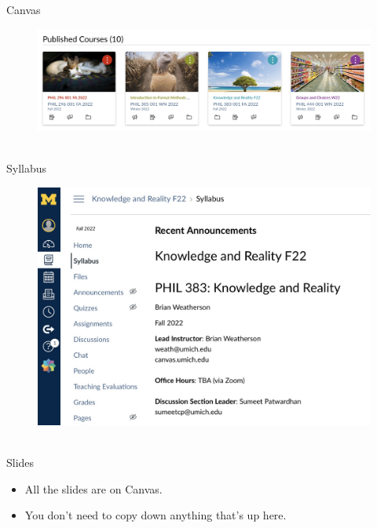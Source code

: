 \documentclass[
  17pt,
  letterpaper,
  ignorenonframetext,
  aspectratio=169,
]{beamer}
\providecommand{\tightlist}{%
  \setlength{\itemsep}{0pt}\setlength{\parskip}{0pt}}\usepackage{longtable,booktabs,array}
\begin{document}
\begin{frame}{Canvas}
\protect\hypertarget{canvas}{}
\begin{figure}

{\centering \includegraphics[width=\textwidth,height=0.6\textheight]{../images/canvas.jpeg}

}

\caption{~}

\end{figure}
\end{frame}

\begin{frame}{Syllabus}
\protect\hypertarget{syllabus}{}
\begin{figure}

{\centering \includegraphics[width=\textwidth,height=0.6\textheight]{../images/syllabus.jpeg}

}

\caption{~}

\end{figure}
\end{frame}

\begin{frame}{Slides}
\protect\hypertarget{slides}{}
\begin{itemize}[<+->]
\tightlist
\item
  All the slides are on Canvas.
\item
  You don't need to copy down anything that's up here.
\end{itemize}
\end{frame}
\end{document}
